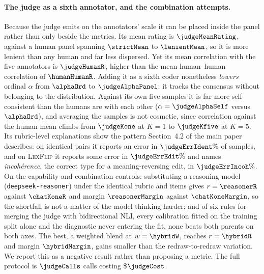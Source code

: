 \documentclass[11pt]{article}
\begin{document}
\paragraph{The judge as a sixth annotator, and the combination attempts.}
Because the judge emits on the annotators' scale it can be placed inside the
panel rather than only beside the metrics. Its mean rating is
$\judgeMeanRating$, against a human panel spanning $\strictMean$ to
$\lenientMean$, so it is more lenient than any human and far less dispersed. Yet
its mean correlation with the five annotators is $\judgeHumanR$, higher than the
mean human--human correlation of $\humanHumanR$. Adding it as a sixth coder
nonetheless \emph{lowers} ordinal $\alpha$ from $\alphaOrd$ to
$\judgeAlphaPanel$: it tracks the consensus without belonging to the
distribution. Against its own five samples it is far more self-consistent than
the humans are with each other ($\alpha=\judgeAlphaSelf$ versus $\alphaOrd$),
and averaging the samples is not cosmetic, since correlation against the human
mean climbs from $\judgeKone$ at $K=1$ to $\judgeKfive$ at $K=5$. Its
rubric-level explanations show the pattern Section~4.2 of the main paper describes: on
identical pairs it reports an error in $\judgeErrIdent\%$ of samples, and on
\textsc{LexFlip} it reports some error in $\judgeErrEdit\%$ and names
\emph{incohérence}, the correct type for a meaning-reversing edit, in
$\judgeErrIncoh\%$. On the capability and combination controls: substituting a
reasoning model (\texttt{deepseek-reasoner}) under the identical rubric and
items gives $r=\reasonerR$ against $\chatKoneR$ and margin $\reasonerMargin$
against $\chatKoneMargin$, so the shortfall is not a matter of the model
thinking harder; and of six rules for merging the judge with bidirectional NLI,
every calibration fitted on the training split alone and the diagnostic never
entering the fit, none beats both parents on both axes. The best, a weighted
blend at $w=\hybridW$, reaches $r=\hybridR$ and margin $\hybridMargin$, gains
smaller than the redraw-to-redraw variation. We report this as a negative result
rather than proposing a metric. The full protocol is $\judgeCalls$ calls costing
\$$\judgeCost$.
\end{document}
